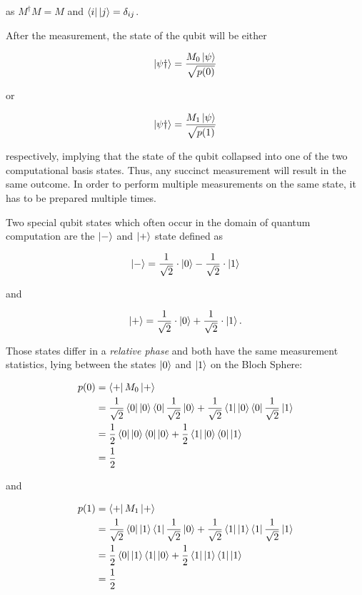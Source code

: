 as $M^{\dagger}M = M$ and $\Bra{i} \Ket{j} = \delta_{ij}$.

After the measurement, the state of the qubit will be either

\begin{equation}
  \Ket{\psi\dagger} = \frac{M_0 \Ket{\psi}}{\sqrt{p(0)}}
\end{equation}

or

\begin{equation}
  \Ket{\psi\dagger} = \frac{M_1 \Ket{\psi}}{\sqrt{p(1)}}
\end{equation}

respectively, implying that the state of the qubit collapsed into one of the two computational
basis states. Thus, any succinct measurement will result in the same outcome.
In order to perform multiple measurements on the same state, it has to be prepared multiple times.

Two special qubit states which often occur in the domain of quantum computation are the $\Ket{-}$ and $\Ket{+}$ state defined as

\begin{equation}
  \Ket{-} = \frac{1}{\sqrt{2}} \cdot \Ket{0} - \frac{1}{\sqrt{2}} \cdot \Ket{1}
\end{equation}

and

\begin{equation}
  \Ket{+} = \frac{1}{\sqrt{2}} \cdot \Ket{0} + \frac{1}{\sqrt{2}} \cdot \Ket{1}.
\end{equation}

Those states differ in a \textit{relative phase} and both have the same measurement statistics, lying between the states $\Ket{0}$ and
$\Ket{1}$ on the Bloch Sphere:

\begin{align}
  p(0) &= \Bra{+} M_0 \Ket{+} \\
       &= \frac{1}{\sqrt{2}} \Bra{0} \Ket{0} \Bra{0} \frac{1}{\sqrt{2}} \Ket{0} + \frac{1}{\sqrt{2}} \Bra{1} \Ket{0} \Bra{0} \frac{1}{\sqrt{2}} \Ket{1} \\
       &= \frac{1}{2} \Bra{0} \Ket{0} \Bra{0} \Ket{0} + \frac{1}{2} \Bra{1} \Ket{0} \Bra{0} \Ket{1} \\
       &= \frac{1}{2}
\end{align}


and

\begin{align}
  p(1) &= \Bra{+} M_1 \Ket{+} \\
       &= \frac{1}{\sqrt{2}} \Bra{0} \Ket{1} \Bra{1} \frac{1}{\sqrt{2}} \Ket{0} + \frac{1}{\sqrt{2}} \Bra{1} \Ket{1} \Bra{1} \frac{1}{\sqrt{2}} \Ket{1} \\
       &= \frac{1}{2} \Bra{0} \Ket{1} \Bra{1} \Ket{0} + \frac{1}{2} \Bra{1} \Ket{1} \Bra{1} \Ket{1} \\
       &= \frac{1}{2}
\end{align}



